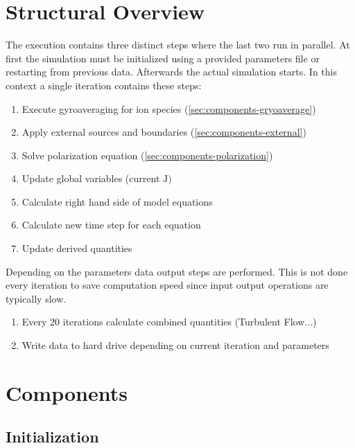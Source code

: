 \section{Structural Overview}
The execution contains three distinct steps where the last two run in parallel. At first the simulation must be initialized using a provided parameters file or restarting from previous data. Afterwards the actual simulation starts. In this context a single iteration contains these steps:
\begin{enumerate}
    \item Execute gyroaveraging for ion species (\autoref{sec:components-gryoaverage})
    \item Apply external sources and boundaries (\autoref{sec:components-external})
    \item Solve polarization equation (\autoref{sec:components-polarization})
    \item Update global variables (current $\mathrm{J})$
    \item Calculate right hand side of model equations
    \item Calculate new time step for each equation
    \item Update derived quantities
\end{enumerate}
Depending on the parameters data output steps are performed. This is not done every iteration to save computation speed since input output operations are typically slow.
\begin{enumerate}
    \item Every 20 iterations calculate combined quantities (Turbulent Flow...)
    \item Write data to hard drive depending on current iteration and parameters
\end{enumerate}
\section{Components}
\subsection{Initialization}
